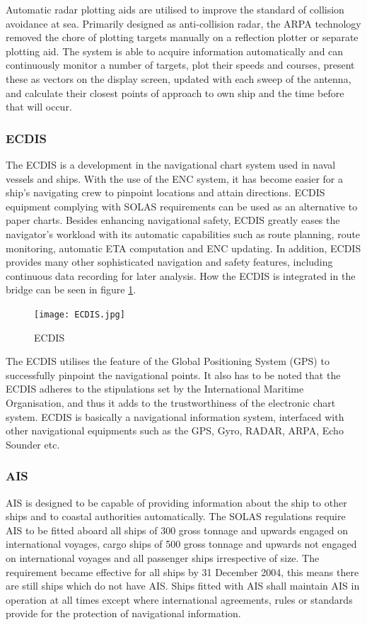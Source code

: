 Automatic radar plotting aids are utilised to improve the standard of collision avoidance at sea. Primarily designed as anti-collision radar, the ARPA technology removed the chore of plotting targets manually on a reflection plotter or separate plotting aid. The system is able to acquire information automatically and can continuously monitor a number of targets, plot their speeds and courses, present these as vectors on the display screen, updated with each sweep of the antenna, and calculate their closest points of approach to own ship and the time before that will occur.

\subsubsection{\acf{ECDIS}}
The \acf{ECDIS} is a development in the navigational chart system used in naval vessels and ships. With the use of the \acf{ENC} system, it has become easier for a ship’s navigating crew to pinpoint locations and attain directions. ECDIS equipment complying with SOLAS requirements can be used as an alternative to paper charts. Besides enhancing navigational safety, ECDIS greatly eases the navigator’s workload with its automatic capabilities such as route planning, route monitoring, automatic ETA computation and ENC updating. In addition, ECDIS provides many other sophisticated navigation and safety features, including continuous data recording for later analysis. How the ECDIS is integrated in the bridge can be seen in figure \ref{fig:ECDIS}.

\begin{figure}[htp]
	\centering
	\texttt{[image: ECDIS.jpg]}
	\caption{\acf{ECDIS}}
	\label{fig:ECDIS}
\end{figure}

The ECDIS utilises the feature of the Global Positioning System (GPS) to successfully pinpoint the navigational points. It also has to be noted that the ECDIS adheres to the stipulations set by the International Maritime Organisation, and thus it adds to the trustworthiness of the electronic chart system. ECDIS is basically a navigational information system, interfaced with other navigational equipments such as the GPS, Gyro, RADAR, ARPA, Echo Sounder etc.

\subsubsection{\acf{AIS}}
\ac{AIS} is designed to be capable of providing information about the ship to other ships and to coastal authorities automatically. The \ac{SOLAS} regulations require \ac{AIS} to be fitted aboard all ships of 300 gross tonnage and upwards engaged on international voyages, cargo ships of 500 gross tonnage and upwards not engaged on international voyages and all passenger ships irrespective of size. The requirement became effective for all ships by 31 December 2004, this means there are still ships which do not have \ac{AIS}. Ships fitted with \ac{AIS} shall maintain \ac{AIS} in operation at all times except where international agreements, rules or standards provide for the protection of navigational information.


